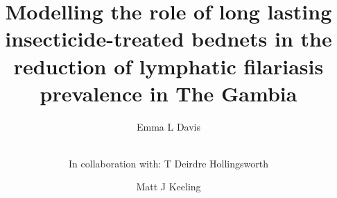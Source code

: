 \documentclass[5p,times]{elsarticle}
\begin{document}

\begin{frontmatter}






\title{Modelling the role of long lasting insecticide-treated bednets in the reduction of lymphatic filariasis prevalence in The Gambia}



\author[First]{Emma L Davis} 
\author[Second]{\\In collaboration with: T Deirdre Hollingsworth} 
\author[Second]{Matt J Keeling}


\address[First]{Mathematics for Real-World Systems Centre for Doctoral Training, University of Warwick}
\address[Second]{Joint Appointment: School of Life Sciences and Mathematics Institute, University of Warwick}


\end{frontmatter}
\end{document}
